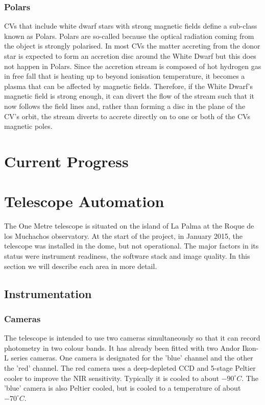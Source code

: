 \documentclass[a4paper,fleqn,usenatbib]{mnras}
\begin{document}
\subsubsection{Polars}
CVs that include white dwarf stars with strong magnetic fields define a sub-class known as Polars. Polars are so-called because the optical radiation coming from the object is strongly polarised. In most CVs the matter accreting from the donor star is expected to form an accretion disc around the White Dwarf but this does not happen in Polars. Since the accretion stream is composed of hot hydrogen gas in free fall that is heating up to beyond ionisation temperature, it becomes a plasma that can be affected by magnetic fields. Therefore, if the White Dwarf's magnetic field is strong enough, it can divert the flow of the stream such that it now follows the field lines and, rather than forming a disc in the plane of the CV's orbit, the stream diverts to accrete directly on to one or both of the CVs magnetic poles. 



\section{Current Progress}

\section{Telescope Automation}
The One Metre telescope is situated on the island of La Palma at the Roque de los Muchachos observatory. At the start of the project, in January 2015, the telescope was installed in the dome, but not operational. The major factors in its status were instrument readiness, the software stack and image quality. In this section we will describe each area in more detail. 

\subsection{Instrumentation}

\subsubsection{Cameras}
The telescope is intended to use two cameras simultaneously so that it can record photometry in two colour bands. It has already been fitted with two Andor Ikon-L series cameras. One camera is designated for the 'blue' channel and the other the 'red' channel. The red camera uses a deep-depleted CCD and 5-stage Peltier cooler to improve the NIR sensitivity. Typically it is cooled to about $-90^\circ C$. The 'blue' camera is also Peltier cooled, but is cooled to a temperature of about $-70^\circ C$.  
\end{document}
